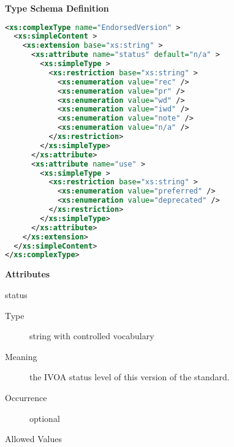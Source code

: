 \documentclass[11pt,a4paper]{ivoa}
\begin{document}
\begin{generated}
\begingroup
        \renewcommand*\descriptionlabel[1]{%
        \hbox to 5.5em{\emph{#1}\hfil}}\vspace{1ex}\noindent\textbf{ Type Schema Definition}

\begin{lstlisting}[language=XML,basicstyle=\footnotesize]
<xs:complexType name="EndorsedVersion" >
  <xs:simpleContent >
    <xs:extension base="xs:string" >
      <xs:attribute name="status" default="n/a" >
        <xs:simpleType >
          <xs:restriction base="xs:string" >
            <xs:enumeration value="rec" />
            <xs:enumeration value="pr" />
            <xs:enumeration value="wd" />
            <xs:enumeration value="iwd" />
            <xs:enumeration value="note" />
            <xs:enumeration value="n/a" />
          </xs:restriction>
        </xs:simpleType>
      </xs:attribute>
      <xs:attribute name="use" >
        <xs:simpleType >
          <xs:restriction base="xs:string" >
            <xs:enumeration value="preferred" />
            <xs:enumeration value="deprecated" />
          </xs:restriction>
        </xs:simpleType>
      </xs:attribute>
    </xs:extension>
  </xs:simpleContent>
</xs:complexType>
\end{lstlisting}

\vspace{0.5ex}\noindent\textbf{ Attributes}

\begingroup\small\begin{bigdescription}
\item[status]
\begin{description}
\item[Type] string with controlled vocabulary
\item[Meaning] 
                 the IVOA status level of this version of the standard.
               
\item[Occurrence] optional

\item[Allowed Values]\hfil
{}
\end{description}
\end{bigdescription}
\end{generated}
\end{document}
